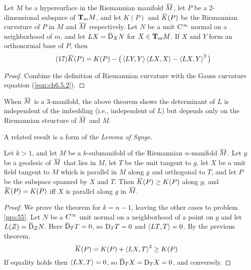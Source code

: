 \documentclass[../main]{subfiles}
\begin{document}
\begin{theorem} \label{thm:ch6.5.1}
Let $M$ be a hypersurface in the Riemannian manifold $\xoverline M$, let $P$ be a 2-dimensional subspace of $\ts Mm$, and let $K(P)$ and $\xoverline K(P)$ be the Riemannian curvature of $P$ in $M$ and $\xoverline M$ respectively. Let $N$ be a unit $\CInfty$ normal on a neighborhood of $m$, and let $LX=\covariant_XN$ for $X\in\ts Mm$. If $X$ and $Y$ form an orthonormal base of $P$, then
\begin{equation} \tag{17}\label{eqn:ch6.5.6}
    \xoverline K(P) = K(P) - \big(\ip{LY}{Y}\ip{LX}{X} - \ip{LX}{Y}^2\big)
\end{equation}
\end{theorem}

\begin{proof}
Combine the definition of Riemannian curvature with the Gauss curvature equation (\ref{eqn:ch6.5.2}).
\end{proof}



When $\xoverline M$ is a 3-manifold, the above theorem shows the determinant of $L$ is independent of the imbedding (i.e., independent of $L$) but depends only on the Riemannian structure of $\xoverline M$ and $M$.

A related result is a form of the \emph{Lemma of Synge}.



\begin{theorem} \label{thm:ch6.5.2}
Let $k>1$, and let $M$ be a $k$-submanifold of the Riemannian $n$-manifold $\xoverline M$. Let $g$ be a geodesic of $\xoverline M$ that lies in $M$, let $T$ be the unit tangent to $g$, let $X$ be a unit field tangent to $M$ which is parallel in $M$ along $g$ and orthogonal to $T$, and let $P$ be the subspace spanned by $X$ and $T$. Then $\xoverline K(P)\ge K(P)$ along $g$, and $\xoverline K(P)=K(P)$ iff $X$ is parallel along $g$ in $\xoverline M$.
\end{theorem}

\begin{proof}
We prove the theorem for $k=n-1$, leaving the other cases to problem \ref{pro:55}. Let $N$ be a $\CInfty$ unit normal on a neighborhood of a point on $g$ and let $L(Z)=\covariant_ZN$. Here $\covariant_TT=0$, so $\D_TT=0$ and $\ip{LT}{T}=0$. By the previous theorem,
\[\xoverline K(P) = K(P) + \ip{LX}{T}^2 \ge K(P)\]
If equality holds then $\ip{LX}{T}=0$, so $\covariant_TX=\D_TX=0$, and conversely.
\end{proof}
\end{document}
